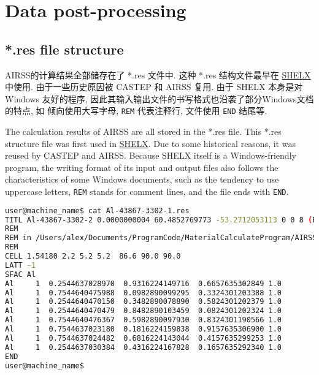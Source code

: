 \documentclass[a4paper, 10pt]{article}
\begin{document}
\newpage
\section{Data post-processing}
\subsection{*.res file structure}
AIRSS的计算结果全部储存在了 *.res 文件中. 这种 *.res 结构文件最早在 \href{https://strucbio.biologie.uni-konstanz.de/ccp4wiki/index.php/SHELXL}{SHELX} 中使用. 由于一些历史原因被 CASTEP 和 AIRSS 复用. 由于 SHELX 本身是对 Windows 友好的程序, 因此其输入输出文件的书写格式也沿袭了部分Windows文档的特点, 如 倾向使用大写字母, \verb|REM| 代表注释行, 文件使用 \verb|END| 结尾等.

The calculation results of AIRSS are all stored in the *.res file. This *.res structure file was first used in \href{https://strucbio.biologie.uni-konstanz.de/ccp4wiki/index.php/SHELXL}{SHELX}. Due to some historical reasons, it was reused by CASTEP and AIRSS. Because SHELX itself is a Windows-friendly program, the writing format of its input and output files also follows the characteristics of some Windows documents, such as the tendency to use uppercase letters, \verb|REM| stands for comment lines, and the file ends with \verb|END|.

\begin{lstlisting}[language={bash}]
user@machine_name$ cat Al-43867-3302-1.res
TITL Al-43867-3302-2 0.0000000004 60.4852769773 -53.2712053113 0 0 8 (P63/mmc) n - 1
REM
REM in /Users/alex/Documents/ProgramCode/MaterialCalculateProgram/AIRSS/airss-0.9/examples/1.1
REM
CELL 1.54180 2.2 5.2 5.2  86.6 90.0 90.0
LATT -1
SFAC Al 
Al     1  0.2544637028970  0.9316224149716  0.6657635302849 1.0
Al     1  0.7544640475988  0.0982890099295  0.3324301203388 1.0
Al     1  0.2544640470150  0.3482890078890  0.5824301202379 1.0
Al     1  0.2544640470479  0.8482890103459  0.0824301202324 1.0
Al     1  0.7544640476367  0.5982890097930  0.8324301190566 1.0
Al     1  0.7544637023180  0.1816224159838  0.9157635306900 1.0
Al     1  0.7544637024482  0.6816224143044  0.4157635299253 1.0
Al     1  0.2544637030384  0.4316224167828  0.1657635292340 1.0
END
user@machine_name$
\end{lstlisting}
\end{document}
